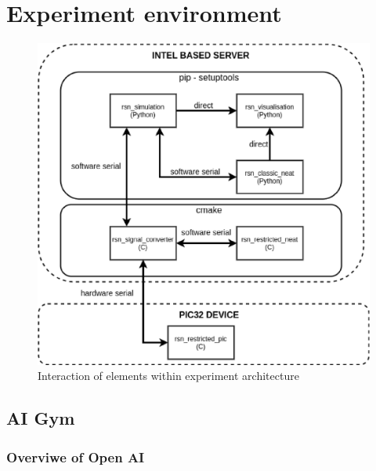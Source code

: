 \FloatBarrier
\chapter{Experiment environment}

\begin{figure}[htb] 
	\centering
	\includegraphics[width=\textwidth]{figures/experiment_arch}
	\caption{Interaction of elements within experiment architecture}
	\label{fig:experiment_arch}
\end{figure}
\FloatBarrier
\section{AI Gym}

\FloatBarrier
\subsection{Overviwe of Open AI}


\FloatBarrier

